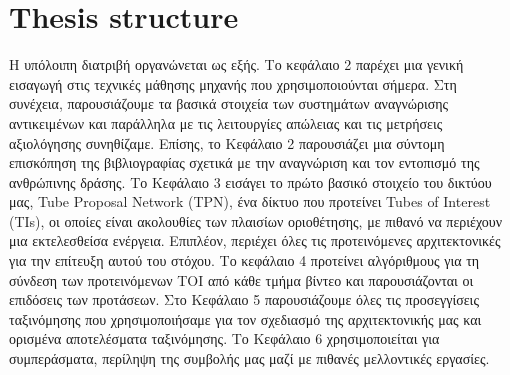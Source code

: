 \section{Thesis structure}
Η υπόλοιπη διατριβή οργανώνεται ως εξής. Το κεφάλαιο 2 παρέχει μια γενική εισαγωγή στις τεχνικές μάθησης μηχανής που χρησιμοποιούνται σήμερα.
Στη συνέχεια, παρουσιάζουμε τα βασικά στοιχεία των συστημάτων αναγνώρισης αντικειμένων και παράλληλα με τις λειτουργίες απώλειας και τις μετρήσεις αξιολόγησης
συνηθίζαμε. Επίσης, το Κεφάλαιο 2 παρουσιάζει μια σύντομη επισκόπηση της βιβλιογραφίας σχετικά με την αναγνώριση και τον εντοπισμό της ανθρώπινης δράσης. Το Κεφάλαιο 3 εισάγει το πρώτο βασικό στοιχείο του δικτύου μας, Tube Proposal Network (TPN), ένα δίκτυο που προτείνει Tubes of Interest (TIs), οι οποίες είναι ακολουθίες των πλαισίων οριοθέτησης, με πιθανό να περιέχουν μια εκτελεσθείσα ενέργεια. Επιπλέον, περιέχει όλες τις προτεινόμενες αρχιτεκτονικές για την επίτευξη αυτού του στόχου.
Το κεφάλαιο 4 προτείνει αλγόριθμους για τη σύνδεση των προτεινόμενων TOI από κάθε τμήμα βίντεο και παρουσιάζονται οι επιδόσεις των προτάσεων.
Στο Κεφάλαιο 5 παρουσιάζουμε όλες τις προσεγγίσεις ταξινόμησης που χρησιμοποιήσαμε για τον σχεδιασμό της αρχιτεκτονικής μας και ορισμένα αποτελέσματα ταξινόμησης.
Το Κεφάλαιο 6 χρησιμοποιείται για συμπεράσματα, περίληψη της συμβολής μας μαζί με πιθανές μελλοντικές εργασίες.

% 
